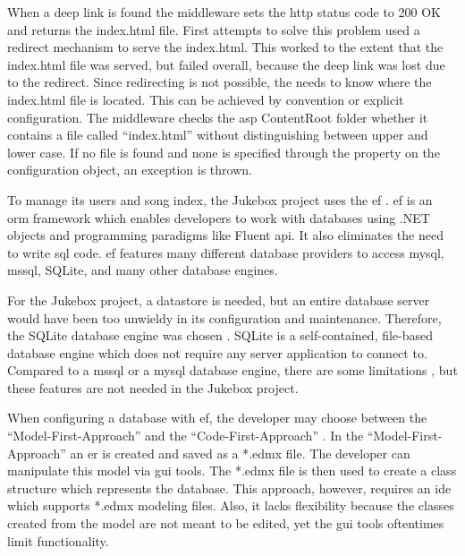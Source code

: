 When a deep link is found the middleware sets the \gls{http} status code to 200 OK and returns the index.html file. First attempts to solve this problem used a redirect mechanism to serve the index.html. This worked to the extent that the index.html file was served, but failed overall, because the deep link was lost due to the redirect. Since redirecting is not possible, the  needs to know where the index.html file is located. This can be achieved by convention or explicit configuration. The middleware checks the \gls{asp} ContentRoot folder whether it contains a file called \enquote{index.html} without distinguishing between upper and lower case. If no file is found and none is specified through the  property on the configuration object, an exception is thrown.

\newpage




To manage its users and song index, the Jukebox project uses the \gls{ef} \cite{efCore}. \gls{ef} is an \gls{orm} framework which enables developers to work with databases using .NET objects and programming paradigms like Fluent \gls{api}. It also eliminates the need to write \gls{sql} code. \gls{ef} features many different database providers to access \gls{mysql}, \gls{mssql}, SQLite, and many other database engines.

For the Jukebox project, a datastore is needed, but an entire database server would have been too unwieldy in its configuration and maintenance. Therefore, the SQLite database engine was chosen \cite{sqlite}. SQLite is a self-contained, file-based database engine which does not require any server application to connect to. Compared to a \gls{mssql} or a \gls{mysql} database engine, there are some limitations \cite{sqliteLimitations}, but these features are not needed in the Jukebox project.


When configuring a database with \gls{ef}, the developer may choose between the \enquote{Model-First-Approach} \cite{modelFirst} and the \enquote{Code-First-Approach} \cite{codeFirst}. In the \enquote{Model-First-Approach} an \gls{er} is created and saved as a *.edmx file. The developer can manipulate this model via \gls{gui} tools. The *.edmx file is then used to create a class structure which represents the database. This approach, however, requires an \gls{ide} which supports *.edmx modeling files. Also, it lacks flexibility because the classes created from the model are not meant to be edited, yet the \gls{gui} tools oftentimes limit functionality.


